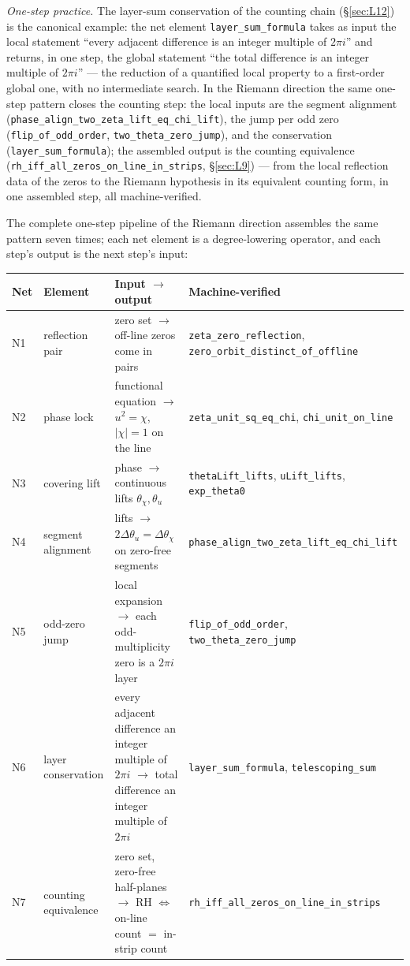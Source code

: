 \documentclass{article}
\newcommand{\Xchi}{\chi}
\begin{document}
\emph{One-step practice.} The layer-sum conservation of the counting
chain (\S\ref{sec:L12}) is the canonical example: the net element
\texttt{layer\_sum\_formula} takes as input the local statement ``every
adjacent difference is an integer multiple of $2\pi i$'' and returns, in
one step, the global statement ``the total difference is an integer
multiple of $2\pi i$'' --- the reduction of a quantified local property
to a first-order global one, with no intermediate search. In the
Riemann direction the same one-step pattern closes the counting step:
the local inputs are the segment alignment
(\texttt{phase\_align\_two\_zeta\_lift\_eq\_chi\_lift}), the jump per odd
zero (\texttt{flip\_of\_odd\_order}, \texttt{two\_theta\_zero\_jump}), and
the conservation (\texttt{layer\_sum\_formula}); the assembled output is
the counting equivalence
(\texttt{rh\_iff\_all\_zeros\_on\_line\_in\_strips}, \S\ref{sec:L9}) ---
from the local reflection data of the zeros to the Riemann hypothesis in
its equivalent counting form, in one assembled step, all machine-verified.

The complete one-step pipeline of the Riemann direction assembles the
same pattern seven times; each net element is a degree-lowering
operator, and each step's output is the next step's input:

\begin{center}
{\small
\begin{tabular}{@{}p{0.9cm}p{4.3cm}p{6.9cm}p{4.4cm}@{}}
\hline
Net & Element & Input $\to$ output & Machine-verified \\
\hline
N1 & reflection pair & zero set $\to$ off-line zeros come in pairs &
\texttt{zeta\_zero\_reflection}, \texttt{zero\_orbit\_distinct\_of\_offline} \\
N2 & phase lock & functional equation $\to$ $u^2=\Xchi$, $|\Xchi|=1$ on the line &
\texttt{zeta\_unit\_sq\_eq\_chi}, \texttt{chi\_unit\_on\_line} \\
N3 & covering lift & phase $\to$ continuous lifts $\theta_\Xchi,\theta_u$ &
\texttt{thetaLift\_lifts}, \texttt{uLift\_lifts}, \texttt{exp\_theta0} \\
N4 & segment alignment & lifts $\to$ $2\Delta\theta_u=\Delta\theta_\Xchi$ on zero-free segments &
\texttt{phase\_align\_two\_zeta\_lift\_eq\_chi\_lift} \\
N5 & odd-zero jump & local expansion $\to$ each odd-multiplicity zero is a $2\pi i$ layer &
\texttt{flip\_of\_odd\_order}, \texttt{two\_theta\_zero\_jump} \\
N6 & layer conservation & every adjacent difference an integer multiple of $2\pi i$ $\to$ total difference an integer multiple of $2\pi i$ &
\texttt{layer\_sum\_formula}, \texttt{telescoping\_sum} \\
N7 & counting equivalence & zero set, zero-free half-planes $\to$ RH $\Longleftrightarrow$ on-line count $=$ in-strip count &
\texttt{rh\_iff\_all\_zeros\_on\_line\_in\_strips} \\
\hline
\end{tabular}
}
\end{center}
\end{document}
